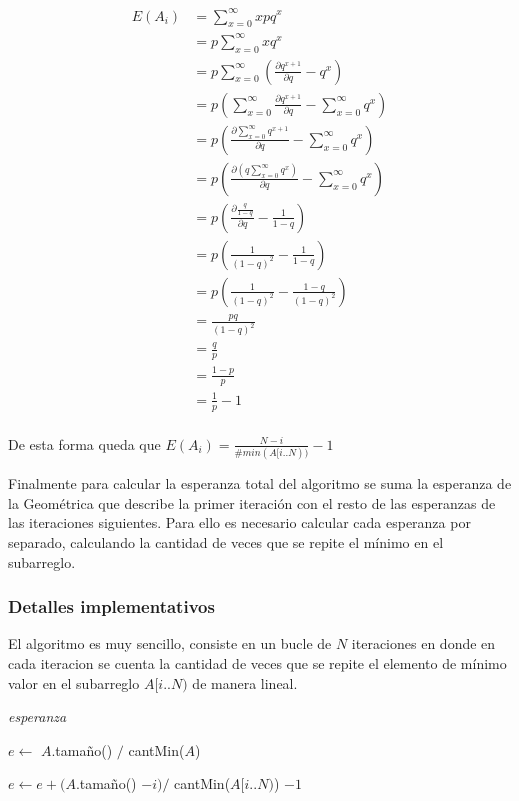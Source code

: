 \[ \begin{aligned}
    E(A_i)  &= \sum_{x = 0}^{\infty}{x p q^x} \\
    		&= p \sum_{x = 0}^{\infty}{x q^x} \\
    		&= p \sum_{x = 0}^{\infty}{\left( \frac{\partial q^{x + 1}}{\partial q} - q^x \right)} \\
    		&= p \left( \sum_{x = 0}^{\infty}{\frac{\partial q^{x + 1}}{\partial q}} - \sum_{x = 0}^{\infty}{q^x} \right) \\
    		&= p \left( \frac{\partial \sum_{x = 0}^{\infty}{q^{x + 1}}}{\partial q} - \sum_{x = 0}^{\infty}{q^x} \right) \\
    		&= p \left( \frac{\partial (q \sum_{x = 0}^{\infty}{q^x})}{\partial q} - \sum_{x = 0}^{\infty}{q^x} \right) \\
    		&= p \left( \frac{\partial \frac{q}{1 - q}}{\partial q} - \frac{1}{1 - q} \right) \\
    		&= p \left( \frac{1}{(1 - q)^2} - \frac{1}{1 - q} \right) \\
    		&= p \left( \frac{1}{(1 - q)^2} - \frac{1 - q}{(1 - q)^2} \right) \\
    		&= \frac{pq}{(1 - q)^2} \\
    		&= \frac{q}{p} \\
    		&= \frac{1 - p}{p} \\
    		&= \frac{1}{p} - 1 \\
\end{aligned} \]

De esta forma queda que $E(A_i) = \frac{N - i}{\#min(A[i..N))} - 1$

Finalmente para calcular la esperanza total del algoritmo se suma la esperanza
de la Geométrica que describe la primer iteración con el resto de las
esperanzas de las iteraciones siguientes. Para ello es necesario calcular
cada esperanza por separado, calculando la cantidad de veces que se repite el
mínimo en el subarreglo.

\subsubsection{Detalles implementativos}

El algoritmo es muy sencillo, consiste en un bucle de $N$ iteraciones en
donde en cada iteracion se cuenta la cantidad de veces que se repite el
elemento de mínimo valor en el subarreglo $A[i..N)$ de manera lineal.

\bigskip

\begin{algorithm}[H]
	\caption{\textit{esperanza}}

	$e \gets$ $A$.tamaño() $/$ cantMin($A$) \;

     {
		$e \gets e + (A$.tamaño() $- i) /$ cantMin($A[i..N)$) $- 1$ \;
	}

\end{algorithm}

